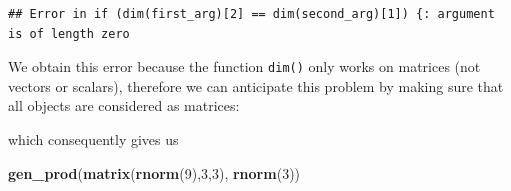 \documentclass[12pt,]{krantz}
\newenvironment{Shaded}{\begin{snugshade}}{\end{snugshade}}
\newcommand{\KeywordTok}[1]{\textcolor[rgb]{0.27,0.27,0.27}{\textbf{#1}}}
\newcommand{\DataTypeTok}[1]{\textcolor[rgb]{0.27,0.27,0.27}{#1}}
\newcommand{\DecValTok}[1]{\textcolor[rgb]{0.06,0.06,0.06}{#1}}
\newcommand{\StringTok}[1]{\textcolor[rgb]{0.5,0.5,0.5}{#1}}
\newcommand{\ControlFlowTok}[1]{\textcolor[rgb]{0.27,0.27,0.27}{\textbf{#1}}}
\newcommand{\OperatorTok}[1]{\textcolor[rgb]{0.43,0.43,0.43}{\textbf{#1}}}
\newcommand{\NormalTok}[1]{#1}
\begin{document}
\begin{verbatim}
## Error in if (dim(first_arg)[2] == dim(second_arg)[1]) {: argument is of length zero
\end{verbatim}

We obtain this error because the function \texttt{dim()} only works on
matrices (not vectors or scalars), therefore we can anticipate this
problem by making sure that all objects are considered as matrices:

\begin{Shaded}
\end{Shaded}

which consequently gives us

\begin{Shaded}
\begin{Highlighting}[]
\KeywordTok{gen_prod}\NormalTok{(}\KeywordTok{matrix}\NormalTok{(}\KeywordTok{rnorm}\NormalTok{(}\DecValTok{9}\NormalTok{),}\DecValTok{3}\NormalTok{,}\DecValTok{3}\NormalTok{), }\KeywordTok{rnorm}\NormalTok{(}\DecValTok{3}\NormalTok{))}
\end{Highlighting}
\end{Shaded}
\end{document}
